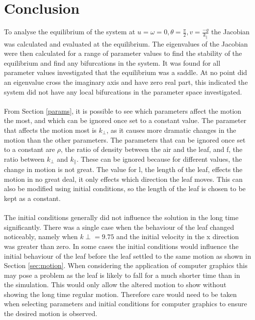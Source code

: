 \section{Conclusion}




To analyse the equilibrium of the system at $u=\omega=0, \theta=\frac{\pi}{2}, v=\frac{-g}{k_{\parallel}}$ the Jacobian was calculated and evaluated at the equilibrium. The eigenvalues of the Jacobian were then calculated for a range of parameter values to find the stability of the equilibrium and find any bifurcations in the system. 
It was found for all parameter values investigated that the equilibrium was a saddle. At no point did an eigenvalue cross the imaginary axis and have zero real part, this indicated the system did not have any local bifurcations in the parameter space investigated.  
\\
\\
From Section \ref{params}, it is possible to see which parameters affect the motion the most, and which can be ignored once set to a constant value. The parameter that affects the motion most is $k_{\perp}$, as it causes more dramatic changes in the motion than the other parameters. The parameters that can be ignored once set to a constant are $\rho$, the ratio of density between the air and the leaf,  and f, the ratio between $k_{\perp}$ and $k_{\parallel}$. These can be ignored because for different values, the change in motion is not great. The value for l, the length of the leaf, effects the motion in no great deal, it only effects which direction the leaf moves. This can also be modified using initial conditions, so the length of the leaf is chosen to be kept as a constant. 
\\
\\
The initial conditions generally did not influence the solution in the long time significantly. There was a single case when the behaviour of the leaf changed noticeably, namely when $k{\perp}=9.75$ and the initial velocity in the x direction was greater than zero. 
In some cases the initial conditions would influence the initial behaviour of the leaf before the leaf settled to the same motion as shown in Section \ref{sec:motion}. When considering the application of computer graphics this may pose a problem as the leaf is likely to fall for a much shorter time than in the simulation. This would only allow the altered motion to show without showing the long time regular motion. Therefore care would need to be taken when selecting parameters and initial conditions for computer graphics to ensure the desired motion is observed.
